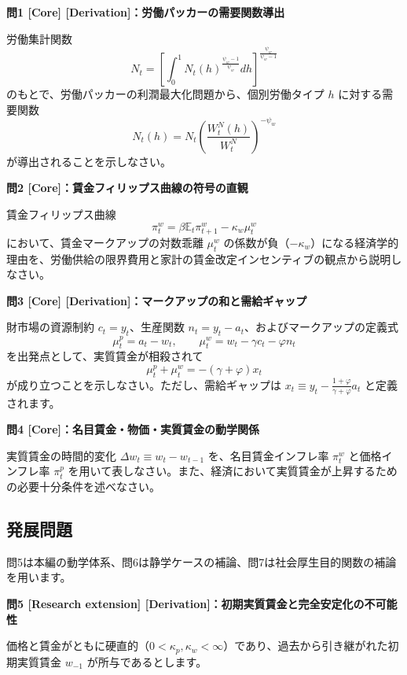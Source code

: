 \documentclass[
  japanese,
  lualatex,
  ja=standard,
  12pt,
  a4paper]{ltjsarticle}
\begin{document}
\textbf{問1 {[}Core{]} {[}Derivation{]}：労働パッカーの需要関数導出}

労働集計関数 \[
N_t
=
\left[
\int_0^1
N_t(h)^{\frac{\psi_w-1}{\psi_w}}dh
\right]^{\frac{\psi_w}{\psi_w-1}}
\] のもとで、労働パッカーの利潤最大化問題から、個別労働タイプ \(h\)
に対する需要関数 \[
N_t(h)
=
N_t
\left(
\frac{W_t^N(h)}{W_t^N}
\right)^{-\psi_w}
\] が導出されることを示しなさい。

\textbf{問2 {[}Core{]}：賃金フィリップス曲線の符号の直観}

賃金フィリップス曲線 \[
\pi^w_t
=
\beta\mathbb{E}_t\pi^w_{t+1}
-
\kappa_w\mu^w_t
\] において、賃金マークアップの対数乖離 \(\mu^w_t\)
の係数が負（\(-\kappa_w\)）になる経済学的理由を、労働供給の限界費用と家計の賃金改定インセンティブの観点から説明しなさい。

\textbf{問3 {[}Core{]} {[}Derivation{]}：マークアップの和と需給ギャップ}

財市場の資源制約 \(c_t=y_t\)、生産関数
\(n_t=y_t-a_t\)、およびマークアップの定義式 \[
\mu^p_t=a_t-w_t,
\qquad
\mu^w_t=w_t-\gamma c_t-\varphi n_t
\] を出発点として、実質賃金が相殺されて \[
\mu^p_t+\mu^w_t=-(\gamma+\varphi)x_t
\] が成り立つことを示しなさい。ただし、需給ギャップは
\(x_t \equiv y_t - \frac{1+\varphi}{\gamma+\varphi}a_t\)
と定義されます。


\textbf{問4 {[}Core{]}：名目賃金・物価・実質賃金の動学関係}

実質賃金の時間的変化 \(\Delta w_t \equiv w_t - w_{t-1}\)
を、名目賃金インフレ率 \(\pi_t^w\) と価格インフレ率 \(\pi_t^p\)
を用いて表しなさい。また、経済において実質賃金が上昇するための必要十分条件を述べなさい。

\subsection{発展問題}\label{sec-lecture10-extensions}

問5は本編の動学体系、問6は静学ケースの補論、問7は社会厚生目的関数の補論を用います。

\textbf{問5 {[}Research extension{]}
{[}Derivation{]}：初期実質賃金と完全安定化の不可能性}

価格と賃金がともに硬直的（\(0<\kappa_p,\kappa_w<\infty\)）であり、過去から引き継がれた初期実質賃金
\(w_{-1}\) が所与であるとします。
\end{document}
